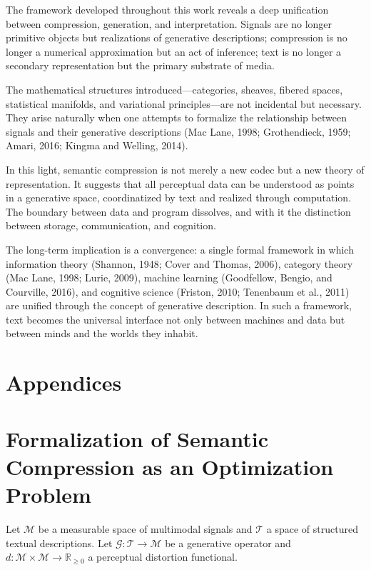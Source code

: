 \documentclass[11pt,a4paper]{article}
\theoremstyle{definition}
\theoremstyle{remark}
\begin{document}
The framework developed throughout this work reveals a deep unification between compression, generation, and interpretation. Signals are no longer primitive objects but realizations of generative descriptions; compression is no longer a numerical approximation but an act of inference; text is no longer a secondary representation but the primary substrate of media.

The mathematical structures introduced---categories, sheaves, fibered spaces, statistical manifolds, and variational principles---are not incidental but necessary. They arise naturally when one attempts to formalize the relationship between signals and their generative descriptions (Mac Lane, 1998; Grothendieck, 1959; Amari, 2016; Kingma and Welling, 2014).

In this light, semantic compression is not merely a new codec but a new theory of representation. It suggests that all perceptual data can be understood as points in a generative space, coordinatized by text and realized through computation. The boundary between data and program dissolves, and with it the distinction between storage, communication, and cognition.

The long-term implication is a convergence: a single formal framework in which information theory (Shannon, 1948; Cover and Thomas, 2006), category theory (Mac Lane, 1998; Lurie, 2009), machine learning (Goodfellow, Bengio, and Courville, 2016), and cognitive science (Friston, 2010; Tenenbaum et al., 2011) are unified through the concept of generative description. In such a framework, text becomes the universal interface not only between machines and data but between minds and the worlds they inhabit.

\newpage
\section*{Appendices}
\appendix

\section{Formalization of Semantic Compression as an Optimization Problem}
\label{app:optimization}

Let $\mathcal{M}$ be a measurable space of multimodal signals and $\mathcal{T}$ a space of structured textual descriptions. Let $\mathcal{G} : \mathcal{T} \to \mathcal{M}$ be a generative operator and $d : \mathcal{M} \times \mathcal{M} \to \mathbb{R}_{\ge 0}$ a perceptual distortion functional.
\end{document}
